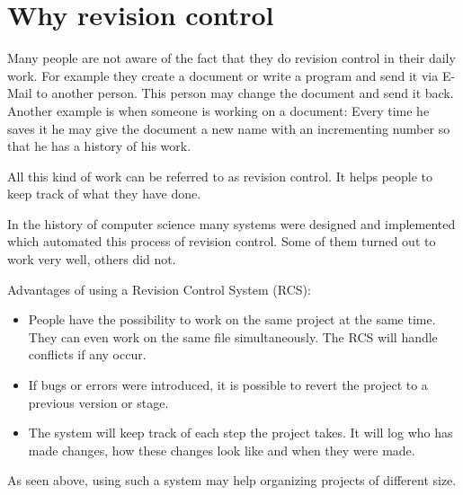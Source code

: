 \section{Why revision control} \label{whyrevisioncontrol}

\cite[chapter 1]{hgbook2009}

Many people are not aware of the fact that they do revision control in their daily work. For example they create a document or write a program and send it via E-Mail to another person. This person may change the document and send it back. Another example is when someone is working on a document: Every time he saves it he may give the document a new name with an incrementing number so that he has a history of his work.

All this kind of work can be referred to as revision control. It helps people to keep track of what they have done.

In the history of computer science many systems were designed and implemented which automated this process of revision control. Some of them turned out to work very well, others did not.

Advantages of using a Revision Control System (RCS):
\begin{itemize}
\item People have the possibility to work on the same project at the same time. They can even work on the same file simultaneously. The RCS will handle conflicts if any occur.
\item If bugs or errors were introduced, it is possible to revert the project to a previous version or stage.
\item The system will keep track of each step the project takes. It will log who has made changes, how these changes look like and when they were made.
\end{itemize}

As seen above, using such a system may help organizing projects of different size.
